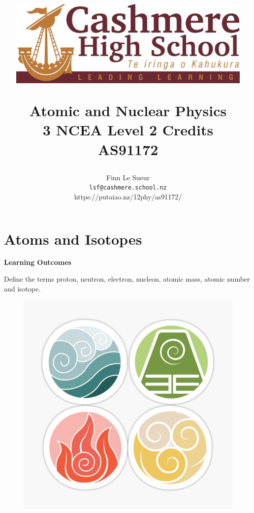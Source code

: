 \documentclass[12pt]{report}
\title{
	\centerline{\includegraphics[width=120mm]{assets/lymphad.jpg}}
	\vspace{2cm}
	\Huge{Atomic and Nuclear Physics}\\
	\large{3 NCEA Level 2 Credits \\ AS91172}
}
\author{Finn Le Sueur \\ \texttt{lsf@cashmere.school.nz} \\ https://putaiao.nz/12phy/as91172/}
\date{
	\vspace{2cm}
	\the\year{}
	\vspace{2cm}
}
\begin{document}
\maketitle

\newpage


\newpage
\setcounter{tocdepth}{1}
\tableofcontents

\newpage
\chapter{Atoms and Isotopes}

\noindent\textbf{Learning Outcomes}
\begin{nwa}
	\item Define the terms proton, neutron, electron, nucleon, atomic mass, atomic number and isotope.
\end{nwa}

\begin{figure}
	\vspace{-1cm}
	\begin{center}
		\includegraphics[width=0.9\linewidth]{four-nations.jpg}
	\end{center}
\end{figure}
\end{document}
